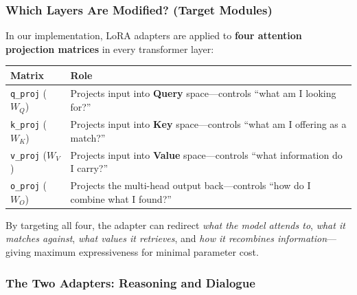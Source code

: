 \subsubsection{Which Layers Are Modified? (Target Modules)}

\begin{acadbox}[\textcolor{white}{Academic Definition}]
In our implementation, LoRA adapters are applied to \textbf{four attention projection matrices} in every transformer layer:
\begin{center}
\begin{tabular}{@{}lp{10cm}@{}}
\toprule
\textbf{Matrix} & \textbf{Role} \\
\midrule
\texttt{q\_proj} ($W_Q$) & Projects input into \textbf{Query} space---controls ``what am I looking for?'' \\
\texttt{k\_proj} ($W_K$) & Projects input into \textbf{Key} space---controls ``what am I offering as a match?'' \\
\texttt{v\_proj} ($W_V$) & Projects input into \textbf{Value} space---controls ``what information do I carry?'' \\
\texttt{o\_proj} ($W_O$) & Projects the multi-head output back---controls ``how do I combine what I found?'' \\
\bottomrule
\end{tabular}
\end{center}

By targeting all four, the adapter can redirect \textit{what the model attends to}, \textit{what it matches against}, \textit{what values it retrieves}, and \textit{how it recombines information}---giving maximum expressiveness for minimal parameter cost.
\end{acadbox}

\subsubsection{The Two Adapters: Reasoning and Dialogue}

